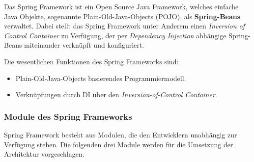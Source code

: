 Das Spring Framework ist ein Open Source Java Framework, welches einfache Java Objekte, sogenannte Plain-Old-Java-Objects (POJO), als \textbf{Spring-Beans} verwaltet. Dabei stellt das Spring Framework unter Anderem einen \textit{Inversion of Control Container} zu Verfügung, der per \textit{Dependency Injection} abhängige Spring-Beans miteinander verknüpft und konfiguriert.

Die wesentlichen Funktionen des Spring Frameworks sind:
\begin{itemize}
	\item Plain-Old-Java-Objects basierendes Programmiermodell.
	\item Verknüpfungen durch DI über den \textit{Inversion-of-Control Container}.
\end{itemize}

\subsubsection{Module des Spring Frameworks}

Spring Framework besteht aus Modulen, die den Entwicklern unabhängig zur Verfügung stehen. Die folgenden drei Module werden für die Umsetzung der Architektur vorgeschlagen.


